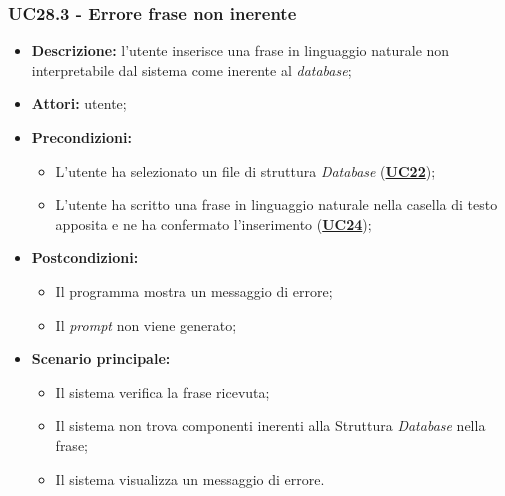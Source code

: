 \subsubsection{UC28.3 - Errore frase non inerente}
\label{sec:UC28.3}
\begin{itemize}
	\item \textbf{Descrizione:} l’utente inserisce una frase in linguaggio naturale non interpretabile dal sistema come inerente al \textit{database};
	\item \textbf{Attori:} utente;
	\item \textbf{Precondizioni:} 
	\begin{itemize}
		\item L’utente ha selezionato un file di struttura \textit{Database} (\hyperref[sec:UC25]{\textbf{UC22}});
		\item L’utente ha scritto una frase in linguaggio naturale nella casella di testo apposita e ne ha confermato l’inserimento (\hyperref[sec:UC27]{\textbf{UC24}});
	\end{itemize}
	\item \textbf{Postcondizioni:} 
	\begin{itemize}
		\item Il programma mostra un messaggio di errore;
		\item Il \textit{prompt} non viene generato;
	\end{itemize}
	\item \textbf{Scenario principale:} 
	\begin{itemize}
		\item Il sistema verifica la frase ricevuta;
		\item Il sistema non trova componenti inerenti alla Struttura \textit{Database} nella frase;
		\item Il sistema visualizza un messaggio di errore.
	\end{itemize}
\end{itemize}

